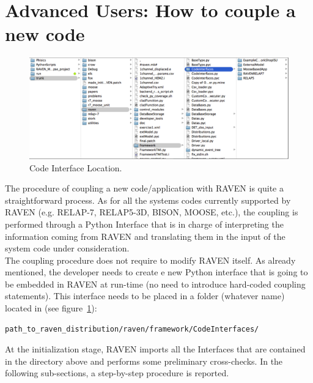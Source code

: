 \section{Advanced Users: How to couple a new code}
\label{sec:newCodeCoupling}
\begin{figure}
\centering
\includegraphics[width=1.0\textwidth]{pics/CodeInterfaceLocation.png}
\caption{Code Interface Location.}
\label{fig:codeinterface}
\end{figure}
The procedure of coupling a new code/application with RAVEN is quite a straightforward process. 
As for all the systems codes currently supported by RAVEN (e.g. RELAP-7, RELAP5-3D, 
BISON, MOOSE, etc.), the coupling is performed through a Python Interface that is in
 charge of interpreting the information coming from RAVEN and translating them in the
  input of the system code under consideration. 
\\The coupling procedure does not require to modify RAVEN itself. As already mentioned,
 the developer needs to create e new Python interface that is going to be embedded 
 in RAVEN at run-time (no need to introduce  hard-coded coupling statements). 
 This interface needs to be placed in a folder (whatever name) located in (see figure~\ref{fig:codeinterface}):
\begin{lstlisting}[language=bash]
 path_to_raven_distribution/raven/framework/CodeInterfaces/
\end{lstlisting}
At the initialization stage, RAVEN imports all the Interfaces that are contained in the directory above and performs some preliminary cross-checks.
In the following sub-sections, a step-by-step procedure is reported.
